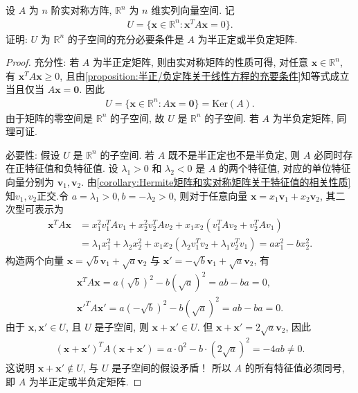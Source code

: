\documentclass[../../main.tex]{subfiles}%
\begin{document}
\begin{example}
设 \(A\) 为 \(n\) 阶实对称方阵, \(\mathbb{R}^n\) 为 \(n\) 维实列向量空间. 记
\begin{align*}
U = \{ \bm{x} \in \mathbb{R}^n : \bm{x}^T A \bm{x} = 0 \}.
\end{align*}
证明: \(U\) 为 \(\mathbb{R}^n\) 的子空间的充分必要条件是 \(A\) 为半正定或半负定矩阵.
\end{example}
\begin{proof}

{\heiti 充分性:} 若 \(A\) 为半正定矩阵, 则由实对称矩阵的性质可得, 对任意 \(\bm{x} \in \mathbb{R}^n\), 有 \(\bm{x}^T A \bm{x} \geqslant 0\), 且由\cref{proposition:半正/负定阵关于线性方程的充要条件}知等式成立当且仅当 \(A\bm{x} = \bm{0}\). 因此
\begin{align*}
U = \{ \bm{x} \in \mathbb{R}^n : A\bm{x} = \bm{0} \} = \mathrm{Ker}(A).
\end{align*}
由于矩阵的零空间是 \(\mathbb{R}^n\) 的子空间, 故 \(U\) 是 \(\mathbb{R}^n\) 的子空间. 若 \(A\) 为半负定矩阵, 同理可证.

{\heiti 必要性:} 假设 \(U\) 是 \(\mathbb{R}^n\) 的子空间. 若 \(A\) 既不是半正定也不是半负定, 则 \(A\) 必同时存在正特征值和负特征值.
设 \(\lambda_1 > 0\) 和 \(\lambda_2 < 0\) 是 \(A\) 的两个特征值, 对应的单位特征向量分别为 \(\bm{v}_1, \bm{v}_2\).
由\cref{corollary:Hermite矩阵和实对称矩阵关于特征值的相关性质}知$v_1,v_2$正交.令 \(a = \lambda_1>0, b =-\lambda_2>0\), 则对于任意向量 \(\bm{x} = x_1 \bm{v}_1 + x_2 \bm{v}_2\), 其二次型可表示为
\begin{align*}
\boldsymbol{x}^TA\boldsymbol{x}&=x_{1}^{2}v_{1}^{T}Av_1+x_{2}^{2}v_{2}^{T}Av_2+x_1x_2\left( v_{1}^{T}Av_2+v_{2}^{T}Av_1 \right) 
\\
&=\lambda _1x_{1}^{2}+\lambda _2x_{2}^{2}+x_1x_2\left( \lambda _2v_{1}^{T}v_2+\lambda _1v_{2}^{T}v_1 \right) =ax_{1}^{2}-bx_{2}^{2}.
\end{align*}
构造两个向量 \(\bm{x} = \sqrt{b} \bm{v}_1 + \sqrt{a} \bm{v}_2\) 与 \(\bm{x}' = -\sqrt{b} \bm{v}_1 + \sqrt{a} \bm{v}_2\), 有
\begin{gather*}
\bm{x}^T A \bm{x} = a(\sqrt{b})^2 - b(\sqrt{a})^2 = ab - ba = 0, \\
\bm{x}'^T A \bm{x}' = a(-\sqrt{b})^2 - b(\sqrt{a})^2 = ab - ba = 0.
\end{gather*}
由于 \(\bm{x}, \bm{x}' \in U\), 且 \(U\) 是子空间, 则 \(\bm{x} + \bm{x}' \in U\).
但 \(\bm{x} + \bm{x}' = 2\sqrt{a} \bm{v}_2\), 因此
\begin{align*}
(\bm{x} + \bm{x}')^T A (\bm{x} + \bm{x}') = a\cdot 0^2 - b\cdot (2\sqrt{a})^2 = -4ab \ne 0.
\end{align*}
这说明 \(\bm{x} + \bm{x}' \notin U\), 与 \(U\) 是子空间的假设矛盾！
所以 \(A\) 的所有特征值必须同号, 即 \(A\) 为半正定或半负定矩阵.
\end{proof}
\end{document}
